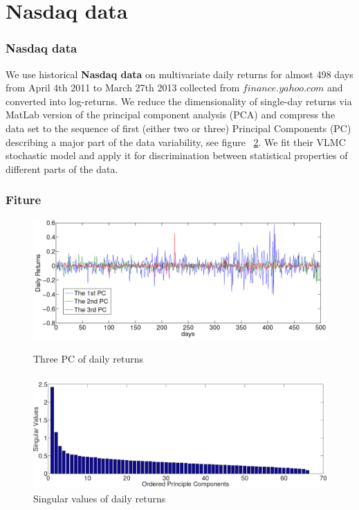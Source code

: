\documentclass{beamer}
\begin{document}
\section {Nasdaq data} 
\begin{frame}
\frametitle{Nasdaq data}
We use historical {\bf Nasdaq data} on multivariate daily returns for almost 498
days from April 4th 2011 to March 27th 2013 collected from $finance.yahoo.com$ and converted into
log-returns. We reduce the dimensionality of single-day returns via MatLab version of
the principal component analysis (PCA) and compress the data set
to the sequence of first (either two or three) Principal Components (PC)
describing a major part of the data variability, see figure ~\ref{fig:SigularValuesOfDailyReturns}. We fit
their VLMC stochastic model and apply it for discrimination between statistical properties of different parts of
the data.




\end{frame}
\begin{frame}
\frametitle{Fiture}
\begin{figure}[h!]
  \centering
\includegraphics[scale=0.29]{FirstThreeDailyReturns.png}
\label{fig:3PcDailyReturns}
  \caption{Three PC of daily returns}
\end{figure}


\end{frame}
\begin{frame}
\frametitle{}
\begin{figure}[h!]
  \centering
      \includegraphics[scale=0.27]{SingularValuesReturns.png}
  \caption{Singular values of daily returns}
\label{fig:SigularValuesOfDailyReturns}
\end{figure}


\end{frame}
\end{document}
